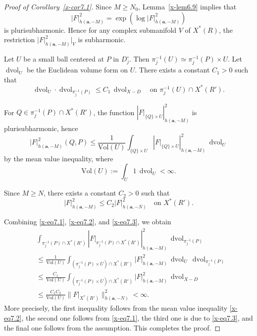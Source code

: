 \documentclass[12pt,twoside]{amsart}
\DeclareMathOperator{\dvol}{dvol}
\theoremstyle{definition}
\begin{document}
\begin{proof}[Proof of Corollary~\ref{x-cor7.1}]
Since $M \ge N_0$, Lemma~\ref{x-lem6.9} implies that
\[
|F|_{h(\bm{a},-M)}^2
= \exp(\log |F|_{h(\bm{a},-M)}^2)
\]
is plurisubharmonic.  
Hence for any complex submanifold $V$ of $X^*(R)$, 
the restriction $|F|_{h(\bm{a},-M)}^2|_V$ is subharmonic.

Let $U$ be a small ball centered at $P$ in $D_j^\circ$.  
Then $\pi_j^{-1}(U) \simeq \pi_j^{-1}(P) \times U$.  
Let $\dvol_U$ be the Euclidean volume form on $U$.  
There exists a constant $C_1>0$ such that
\begin{equation}\label{x-eq7.1}
\dvol_U \cdot \dvol_{\pi_j^{-1}(P)}
\le C_1 \, \dvol_{X-D}
\quad \text{on } \pi_j^{-1}(U) \cap X^*(R').
\end{equation}

For $Q \in \pi_j^{-1}(P) \cap X^*(R')$, the function  
$\left|F|_{\{Q\}\times U}\right|^2_{h(\bm{a},-M)}$ is plurisubharmonic, hence
\begin{equation}\label{x-eq7.2}
|F|_{h(\bm{a},-M)}^2(Q,P)
\le \frac{1}{\mathrm{Vol}(U)}
\int_{\{Q\}\times U}
\left|F|_{\{Q\}\times U}\right|^2_{h(\bm{a},-M)} \, \dvol_U
\end{equation}
by the mean value inequality, where
\[
\mathrm{Vol}(U) := \int_U 1 \, \dvol_U < \infty.
\]

Since $M \ge N$, there exists a constant $C_2>0$ such that
\begin{equation}\label{x-eq7.3}
|F|_{h(\bm{a},-M)}^2 \le C_2 |F|_{h(\bm{a},-N)}^2
\quad \text{on } X^*(R').
\end{equation}

Combining \eqref{x-eq7.1}, \eqref{x-eq7.2}, and \eqref{x-eq7.3}, we obtain
\[
\begin{aligned}
&\int_{\pi_j^{-1}(P)\cap X^*(R')}
\left|F|_{\pi_j^{-1}(P)\cap X^*(R')} \right|_{h(\bm{a},-M)}^2
\, \dvol_{\pi_j^{-1}(P)} \\
&\le \frac{1}{\mathrm{Vol}(U)}
\int_{(\pi_j^{-1}(P)\times U)\cap X^*(R')}
|F|_{h(\bm{a},-M)}^2 \, \dvol_U \, \dvol_{\pi_j^{-1}(P)} \\
&\le \frac{C_1}{\mathrm{Vol}(U)}
\int_{(\pi_j^{-1}(P)\times U)\cap X^*(R')}
|F|_{h(\bm{a},-M)}^2 \, \dvol_{X-D} \\
&\le \frac{C_1 C_2}{\mathrm{Vol}(U)}
\|F|_{X^*(R')}\|_{h(\bm{a},-N)}^2
< \infty.
\end{aligned}
\] 
More precisely, the first inequality follows from the mean value inequality \eqref{x-eq7.2}, 
the second one follows from \eqref{x-eq7.1}, the third one is due to \eqref{x-eq7.3}, 
and the final one follows from the assumption. 
This completes the proof. 
\end{proof}
\end{document}
